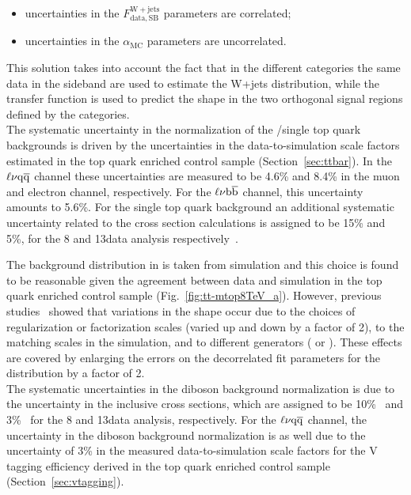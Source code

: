 \begin{itemize}
\item uncertainties in the $F_\mathrm{data, SB}^{\mathrm{W+jets}}$ parameters are correlated;
\item uncertainties in the $\alpha_\mathrm{MC}$ parameters are uncorrelated.
\end{itemize}

This solution takes into account the fact that in the different \mJ categories the same data in the sideband are used to estimate the W+jets distribution, while the transfer function is used to predict the shape in the two orthogonal signal regions defined by the categories.\\

The systematic uncertainty in the normalization of the \ttbar/single top quark backgrounds is driven by the uncertainties in the data-to-simulation scale factors estimated in the top quark enriched control sample (Section~\ref{sec:ttbar}). In the $\ell\nu\mathrm{q}\overline{\mathrm{q}}$ channel these uncertainties are measured to be 4.6\% and 8.4\% in the muon and electron channel, respectively. For the $\ell\nu{\mathrm{b}\overline{\mathrm{b}}}$ channel, this uncertainty amounts to 5.6\%.
For the single top quark background an additional systematic uncertainty related to the cross section calculations is assigned to be 15\% and 5\%, for the 8 and 13\TeV data analysis respectively~\cite{Chatrchyan:2012ep,Kant:2014oha}.

The \ttbar background distribution in \mlvj is taken from simulation and this choice is found to be reasonable given the
agreement between data and simulation in the top quark enriched control sample (Fig.~\ref{fig:tt-mtop8TeV_a}).
However, previous studies~\cite{Khachatryan:2014gha} showed that variations in the shape occur due to the choices of regularization or factorization scales (varied up and down by a factor of 2),
to the matching scales in the \MADGRAPH{} simulation, and to different generators (\MADGRAPH{} or \POWHEG{}).
These effects are covered by enlarging the errors on the decorrelated fit parameters for the \ttbar distribution by a factor of 2.\\

The systematic uncertainties in the diboson background normalization is due to the uncertainty in the inclusive cross sections, which are assigned to be 10\%~\cite{Chatrchyan:2013oev} and 3\%~\cite{Gehrmann:2014fva} for the 8 and 13\TeV data analysis, respectively.
For the $\ell\nu\mathrm{q}\overline{\mathrm{q}}$ channel, the uncertainty in the diboson background normalization is as well due to the uncertainty of 3\% in the measured data-to-simulation scale factors for the V tagging efficiency derived in the top quark enriched control sample (Section~\ref{sec:vtagging}).\\

